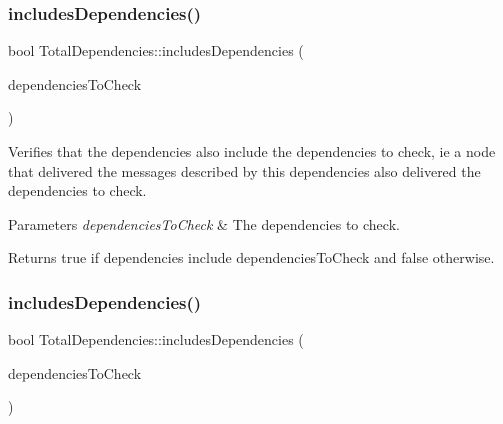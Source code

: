 \mbox{\label{class_total_dependencies_a66aebb100cbce0faf5551fd74b0de0d8}} 
\subsubsection{\texorpdfstring{includes\+Dependencies()}{includesDependencies()}\hspace{0.1cm}{\footnotesize\ttfamily [1/2]}}
{\footnotesize\ttfamily bool Total\+Dependencies\+::includes\+Dependencies (\begin{DoxyParamCaption}\item[{const \hyperlink{class_total_dependencies}{Total\+Dependencies} \&}]{dependencies\+To\+Check }\end{DoxyParamCaption})}



Verifies that the dependencies also include the dependencies to check, ie a node that delivered the messages described by this dependencies also delivered the dependencies to check. 


\begin{DoxyParams}{Parameters}
{\em dependencies\+To\+Check} & The dependencies to check. \\
\hline
\end{DoxyParams}
\begin{DoxyReturn}{Returns}
true if dependencies include dependencies\+To\+Check and false otherwise. 
\end{DoxyReturn}
\mbox{\label{class_total_dependencies_aed1c3ce4bee031ca9341d8ce4a179ef0}} 
\subsubsection{\texorpdfstring{includes\+Dependencies()}{includesDependencies()}\hspace{0.1cm}{\footnotesize\ttfamily [2/2]}}
{\footnotesize\ttfamily bool Total\+Dependencies\+::includes\+Dependencies (\begin{DoxyParamCaption}\item[{const vector$<$ \hyperlink{structures_8h_a83a1d9a070efa5341da84cfd8e28d3e5}{id\+Msg} $>$ \&}]{dependencies\+To\+Check }\end{DoxyParamCaption})}



